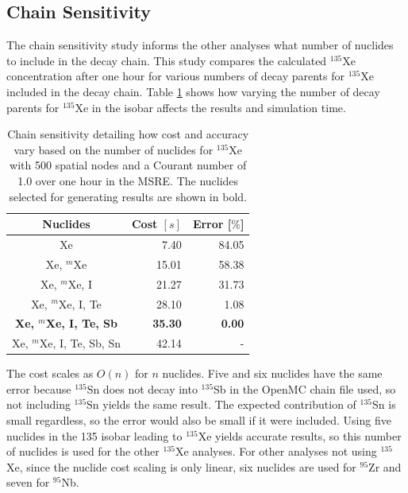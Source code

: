\documentclass{style/nseJournal}
\begin{document}
\subsection{Chain Sensitivity}

The chain sensitivity study informs the other analyses what number of nuclides to include in the decay chain.
This study compares the calculated $^{135}$Xe concentration after one hour for various numbers of decay parents for $^{135}$Xe included in the decay chain.
Table \ref{tab:nuc-ref} shows how varying the number of decay parents for $^{135}$Xe in the isobar affects the results and simulation time.



\begin{table}[!ht]
    \centering
    \caption{Chain sensitivity detailing how cost and accuracy vary based on the number of nuclides for $^{135}$Xe with 500 spatial nodes and a Courant number of 1.0 over one hour in the MSRE.  The nuclides selected for generating results are shown in bold.}
    \begin{tabular}{c r r}
       \hline
       Nuclides  & Cost $[s]$ & Error [$\%$]\\
       \hline
        Xe & 7.40 & 84.05\\
        Xe, $^{m}$Xe & 15.01 & 58.38\\
        Xe, $^{m}$Xe, I & 21.27 & 31.73\\
        Xe, $^{m}$Xe, I, Te & 28.10 & 1.08\\
        \textbf{Xe, $^{m}$Xe, I, Te, Sb} & \textbf{35.30} & \textbf{0.00}\\
        Xe, $^{m}$Xe, I, Te, Sb, Sn & 42.14 & -\\
        \hline
    \end{tabular}

    \label{tab:nuc-ref}
\end{table}

The cost scales as $O(n)$ for $n$ nuclides.
Five and six nuclides have the same error because $^{135}$Sn does not decay into $^{135}$Sb in the OpenMC chain file used, so not including $^{135}$Sn yields the same result.
The expected contribution of $^{135}$Sn is small regardless, so the error would also be small if it were included.
Using five nuclides in the 135 isobar leading to $^{135}$Xe yields accurate results, so this number of nuclides is used for the other $^{135}$Xe analyses.
For other analyses not using $^{135}$Xe, since the nuclide cost scaling is only linear, six nuclides are used for $^{95}$Zr and seven for $^{95}$Nb.
\end{document}
